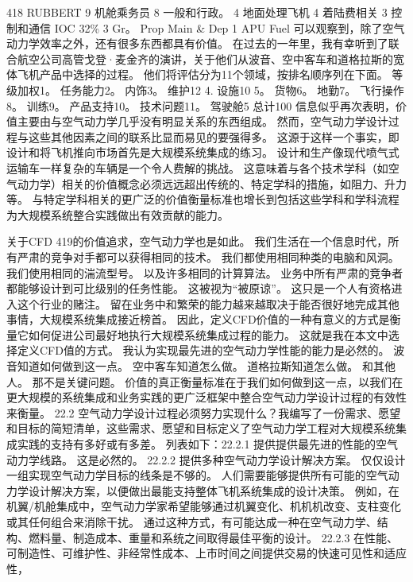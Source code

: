 \documentclass[UTF8,11pt,a4paper,openany,fontset=fandol]{ctexbook}
\begin{document}
418 RUBBERT 9 机舱乘务员 8 一般和行政。 4 地面处理飞机 4 着陆费相关 3 控制和通信 IOC 32\% 3 Gr。 Prop Main \& Dep 1 APU Fuel 可以观察到，除了空气动力学效率之外，还有很多东西都具有价值。 在过去的一年里，我有幸听到了联合航空公司高管戈登·麦金齐的演讲，关于他们从波音、空中客车和道格拉斯的宽体飞机产品中选择的过程。 他们将评估分为11个领域，按排名顺序列在下面。 等级加权1。 任务能力2。 内饰3。 维护12 4. 设施10 5。 货物6。 地勤7。 飞行操作8。 训练9。 产品支持10。 技术问题11。 驾驶舱5 总计100 信息似乎再次表明，价值主要由与空气动力学几乎没有明显关系的东西组成。 然而，空气动力学设计过程与这些其他因素之间的联系比显而易见的要强得多。 这源于这样一个事实，即设计和将飞机推向市场首先是大规模系统集成的练习。 设计和生产像现代喷气式运输车一样复杂的车辆是一个令人费解的挑战。 这意味着与各个技术学科（如空气动力学）相关的价值概念必须远远超出传统的、特定学科的措施，如阻力、升力等。 与特定学科相关的更广泛的价值衡量标准也增长到包括这些学科和学科流程为大规模系统整合实践做出有效贡献的能力。

关于CFD 419的价值追求，空气动力学也是如此。 我们生活在一个信息时代，所有严肃的竞争对手都可以获得相同的技术。 我们都使用相同种类的电脑和风洞。 我们使用相同的湍流型号。 以及许多相同的计算算法。 业务中所有严肃的竞争者都能够设计到可比级别的任务性能。 这被视为“被原谅”。 这只是一个人有资格进入这个行业的赌注。 留在业务中和繁荣的能力越来越取决于能否很好地完成其他事情，大规模系统集成接近榜首。 因此，定义CFD价值的一种有意义的方式是衡量它如何促进公司最好地执行大规模系统集成过程的能力。 这就是我在本文中选择定义CFD值的方式。 我认为实现最先进的空气动力学性能的能力是必然的。 波音知道如何做到这一点。 空中客车知道怎么做。 道格拉斯知道怎么做。 和其他人。 那不是关键问题。 价值的真正衡量标准在于我们如何做到这一点，以我们在更大规模的系统集成和业务实践的更广泛框架中整合空气动力学设计过程的有效性来衡量。 22.2 空气动力学设计过程必须努力实现什么？我编写了一份需求、愿望和目标的简短清单，这些需求、愿望和目标定义了空气动力学工程对大规模系统集成实践的支持有多好或有多差。 列表如下：22.2.1 提供提供最先进的性能的空气动力学线路。 这是必然的。 22.2.2 提供多种空气动力学设计解决方案。 仅仅设计一组实现空气动力学目标的线条是不够的。 人们需要能够提供所有可能的空气动力学设计解决方案，以便做出最能支持整体飞机系统集成的设计决策。 例如，在机翼/机舱集成中，空气动力学家希望能够通过机翼变化、机机机改变、支柱变化或其任何组合来消除干扰。 通过这种方式，有可能达成一种在空气动力学、结构、燃料量、制造成本、重量和系统之间取得最佳平衡的设计。 22.2.3 在性能、可制造性、可维护性、非经常性成本、上市时间之间提供交易的快速可见性和适应性，
\end{document}
